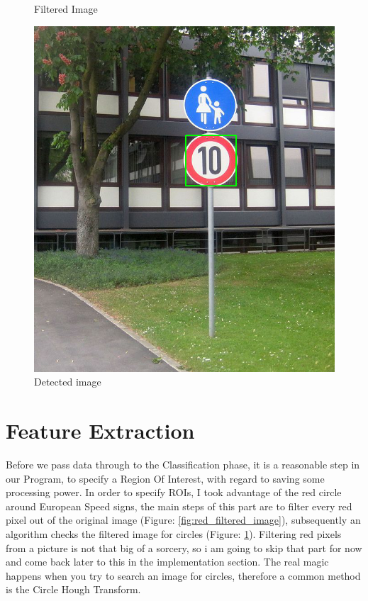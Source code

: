 \begin{figure}[H]
	\caption{Filtered Image}\label{fig:red_filtered_image}
	\endminipage\hfill
	\includegraphics[width=\linewidth]{images/detectedimg.png}
	\caption{Detected image}\label{fig:detected_image}
	\endminipage
\end{figure}

\section{Feature Extraction}
Before we pass data through to the Classification phase, it is a reasonable step in our Program, to specify a Region Of Interest, with regard to saving some processing power. In order to specify ROIs, I took advantage of the red circle around European Speed signs, the main steps of this part are to filter every red pixel out of the original image (Figure: \ref{fig:red_filtered_image}), subsequently an algorithm checks the filtered image for circles (Figure: \ref{fig:detected_image}). Filtering red pixels from a picture is not that big of a sorcery, so i am going to skip that part for now and come back later to this in the implementation section. The real magic happens when you try to search an image for circles, therefore a common method is the Circle Hough Transform. 

